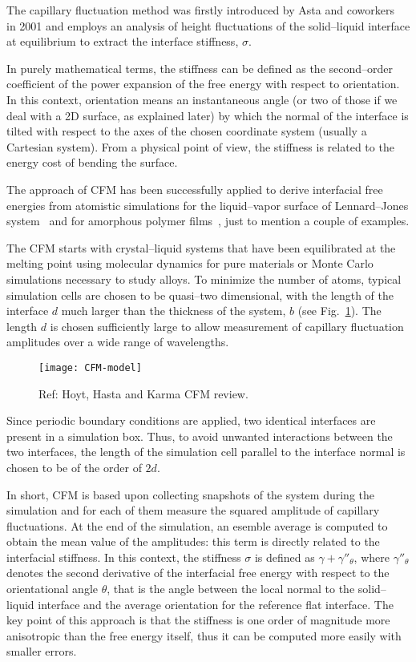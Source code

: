 The capillary fluctuation method was firstly introduced by Asta and coworkers~\cite{HoytPRL2001:CFM} in 2001 and employs an analysis of height fluctuations
of the solid--liquid interface at equilibrium to extract the interface stiffness, $\sigma$.

In purely mathematical terms, the stiffness can be defined as the second--order coefficient of the power expansion of the free energy with respect to orientation. In this context, orientation means an instantaneous angle (or two of those if we deal with a 2D surface, as explained later) by which the normal of the interface is tilted with respect to the axes of the chosen coordinate system (usually a Cartesian system). From a physical point of view, the stiffness is related to the energy cost of bending the surface.

The approach of CFM has been successfully applied to derive interfacial free energies from atomistic simulations for the liquid--vapor surface of Lennard--Jones system~\cite{Sides1999:HoytREVIEW43} and for amorphous polymer films~\cite{Hapke1998:HoytREVIEW44}, just to mention a couple of examples.

The CFM starts with crystal–liquid systems that have been equilibrated at the melting point
using molecular dynamics for pure materials or Monte Carlo simulations necessary to study alloys. To minimize the number of atoms, typical simulation cells are chosen to be quasi--two dimensional, with the length of the interface $d$ much larger than the thickness of the system, $b$ (see Fig.~\ref{fig:CFM_model}). The length $d$ is chosen sufficiently large to allow measurement of capillary fluctuation amplitudes over a wide range of wavelengths.
\begin{figure}[bt]
    \centering
    \texttt{[image: CFM-model]}
    \caption{Ref: Hoyt, Hasta and Karma CFM review.}
    \label{fig:CFM_model}
\end{figure}

Since periodic boundary conditions are applied, two identical interfaces are present in a simulation box. Thus, to avoid unwanted interactions between the two interfaces, the length of the simulation cell parallel to the interface normal is chosen to be of the order of $2d$.

In short, CFM is based upon collecting snapshots of the system during the simulation and for each of them measure the squared amplitude of capillary fluctuations. At the end of the simulation, an esemble average is computed to obtain the mean value of the amplitudes: this term is directly related to the interfacial stiffness. In this context, the stiffness $\sigma$ is defined as $\gamma + \gamma''_{\theta}$, where $\gamma''_{\theta}$ denotes the second derivative of the interfacial free energy with respect to the orientational angle $\theta$, that is the angle between the local normal to the solid--liquid interface and the average orientation for the reference flat interface. The key point of this approach is that the stiffness is one order of magnitude more anisotropic than the free energy itself, thus it can be computed more easily with smaller errors.

